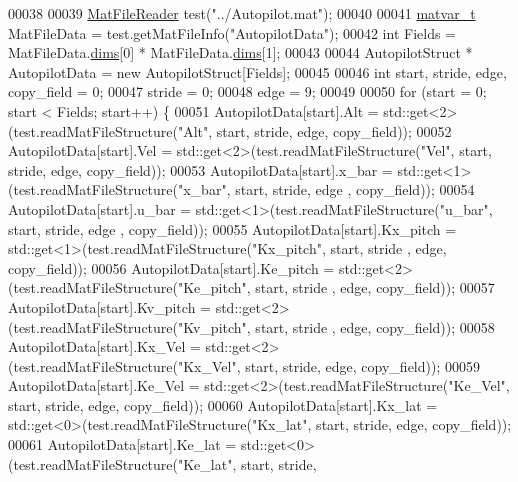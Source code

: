 \begin{DoxyCode}
00038 
00039         \hyperlink{class_mat_file_reader}{MatFileReader} test(\textcolor{stringliteral}{"../Autopilot.mat"});
00040 
00041         \hyperlink{group___m_a_t_structmatvar__t}{matvar\_t} MatFileData = test.getMatFileInfo(\textcolor{stringliteral}{"AutopilotData"});
00042         \textcolor{keywordtype}{int} Fields = MatFileData.\hyperlink{group___m_a_t_a8e01234e1c862ce3472bb37f5a09b92c}{dims}[0] * MatFileData.\hyperlink{group___m_a_t_a8e01234e1c862ce3472bb37f5a09b92c}{dims}[1];
00043 
00044         AutopilotStruct * AutopilotData = \textcolor{keyword}{new} AutopilotStruct[Fields];
00045 
00046         \textcolor{keywordtype}{int} start, stride, edge, copy\_field = 0;
00047         stride = 0;
00048         edge = 9;
00049 
00050         \textcolor{keywordflow}{for} (start = 0; start < Fields; start++) \{
00051             AutopilotData[start].Alt = std::get<2>(test.readMatFileStructure(\textcolor{stringliteral}{"Alt"}, start, stride, edge, 
      copy\_field));
00052             AutopilotData[start].Vel = std::get<2>(test.readMatFileStructure(\textcolor{stringliteral}{"Vel"}, start, stride, edge, 
      copy\_field));
00053             AutopilotData[start].x\_bar = std::get<1>(test.readMatFileStructure(\textcolor{stringliteral}{"x\_bar"}, start, stride, edge
      , copy\_field));
00054             AutopilotData[start].u\_bar = std::get<1>(test.readMatFileStructure(\textcolor{stringliteral}{"u\_bar"}, start, stride, edge
      , copy\_field));
00055             AutopilotData[start].Kx\_pitch = std::get<1>(test.readMatFileStructure(\textcolor{stringliteral}{"Kx\_pitch"}, start, stride
      , edge, copy\_field));
00056             AutopilotData[start].Ke\_pitch = std::get<2>(test.readMatFileStructure(\textcolor{stringliteral}{"Ke\_pitch"}, start, stride
      , edge, copy\_field));
00057             AutopilotData[start].Kv\_pitch = std::get<2>(test.readMatFileStructure(\textcolor{stringliteral}{"Kv\_pitch"}, start, stride
      , edge, copy\_field));
00058             AutopilotData[start].Kx\_Vel = std::get<2>(test.readMatFileStructure(\textcolor{stringliteral}{"Kx\_Vel"}, start, stride, 
      edge, copy\_field));
00059             AutopilotData[start].Ke\_Vel = std::get<2>(test.readMatFileStructure(\textcolor{stringliteral}{"Ke\_Vel"}, start, stride, 
      edge, copy\_field));
00060             AutopilotData[start].Kx\_lat = std::get<0>(test.readMatFileStructure(\textcolor{stringliteral}{"Kx\_lat"}, start, stride, 
      edge, copy\_field));
00061             AutopilotData[start].Ke\_lat = std::get<0>(test.readMatFileStructure(\textcolor{stringliteral}{"Ke\_lat"}, start, stride, 

\end{DoxyCode}
